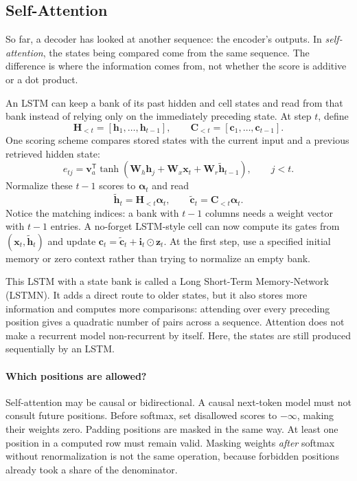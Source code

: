 \documentclass[11pt, oneside]{book}
\newcommand{\T}{^{\mathsf{T}}}           %
\let\originalsubsection\subsection
\renewcommand{\subsection}{\Needspace{6\baselineskip}\originalsubsection}
\begin{document}
\subsection{Self-Attention}\label{sec:source-4-2-3}
So far, a decoder has looked at another sequence: the encoder's outputs. In \emph{self-attention}, the states being compared come from the same sequence. The difference is where the information comes from, not whether the score is additive or a dot product.

An LSTM can keep a bank of its past hidden and cell states and read from that bank instead of relying only on the immediately preceding state. At step $t$, define
\[
 \mathbf{H}_{<t}=[\mathbf{h}_1,\ldots,\mathbf{h}_{t-1}],\qquad
 \mathbf{C}_{<t}=[\mathbf{c}_1,\ldots,\mathbf{c}_{t-1}].
\]
One scoring scheme compares stored states with the current input and a previous retrieved hidden state:
\[
 e_{tj}=\mathbf{v}_a\T\tanh(\mathbf{W}_h\mathbf{h}_j+
            \mathbf{W}_x\mathbf{x}_t+\mathbf{W}_r\widetilde{\mathbf{h}}_{t-1}),
 \qquad j<t.
\]
Normalize these $t-1$ scores to $\boldsymbol{\alpha}_t$ and read
\[
 \widetilde{\mathbf{h}}_t=\mathbf{H}_{<t}\boldsymbol{\alpha}_t,\qquad
 \widetilde{\mathbf{c}}_t=\mathbf{C}_{<t}\boldsymbol{\alpha}_t.
\]
Notice the matching indices: a bank with $t-1$ columns needs a weight vector with $t-1$ entries. A no-forget LSTM-style cell can now compute its gates from $(\mathbf{x}_t,\widetilde{\mathbf{h}}_t)$ and update $\mathbf{c}_t=\widetilde{\mathbf{c}}_t+\mathbf{i}_t\odot\mathbf{z}_t$. At the first step, use a specified initial memory or zero context rather than trying to normalize an empty bank.

This LSTM with a state bank is called a Long Short-Term Memory-Network (LSTMN). It adds a direct route to older states, but it also stores more information and computes more comparisons: attending over every preceding position gives a quadratic number of pairs across a sequence. Attention does not make a recurrent model non-recurrent by itself. Here, the states are still produced sequentially by an LSTM.

\paragraph{Which positions are allowed?} Self-attention may be causal or bidirectional. A causal next-token model must not consult future positions. Before softmax, set disallowed scores to $-\infty$, making their weights zero. Padding positions are masked in the same way. At least one position in a computed row must remain valid. Masking weights \emph{after} softmax without renormalization is not the same operation, because forbidden positions already took a share of the denominator.
\end{document}
